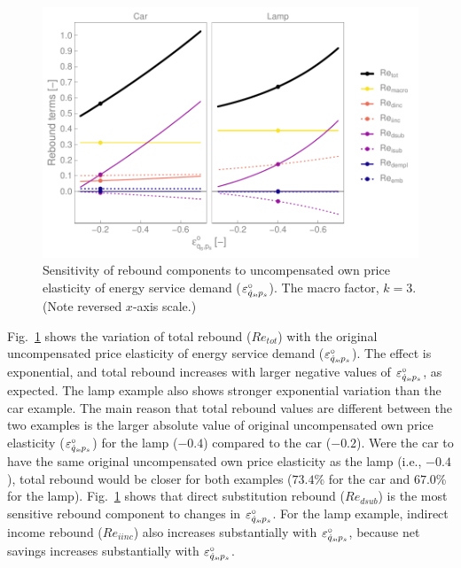 \documentclass[12pt]{article}\usepackage[]{graphicx}\usepackage[]{xcolor}
\makeatletter
\def\maxwidth{ %
  \ifdim\Gin@nat@width>\linewidth
    \linewidth
  \else
    \Gin@nat@width
  \fi
}
\newenvironment{knitrout}{}{} %
\makeatother
\begin{document}
\begin{knitrout}
\color{fgcolor}\begin{figure}

{\centering \includegraphics[width=\maxwidth]{figure/all_Re_terms_eps_graph-1} 

}

\caption[Sensitivity of rebound components to uncompensated own price elasticity of energy service demand ($\eqspsUCorig$)]{Sensitivity of rebound components to uncompensated own price elasticity of energy service demand ($\eqspsUCorig$). The macro factor, $k = 3$. (Note reversed $x$-axis scale.)}\label{fig:all_Re_terms_eps_graph}
\end{figure}

\end{knitrout}
  
  


Fig.~\ref{fig:all_Re_terms_eps_graph} shows the variation of total rebound ($Re_{tot}$)
with the original uncompensated price elasticity of energy service demand ($\eqspsUCorig$).
The effect is exponential, and
total rebound increases with larger negative values of $\eqspsUCorig$, as expected.
The lamp example also shows stronger exponential variation than the car example.
The main reason that total rebound values 
are different between the two examples
is the larger absolute value of original uncompensated own price elasticity ($\eqspsUCorig$) 
for the lamp ($-0.4$) compared to the car ($-0.2$).
Were the car to have the same original uncompensated own price elasticity
as the lamp (i.e., $-0.4$), 
total rebound would be closer for both examples 
($73.4$\% for the car and 
$67.0$\% for the lamp).
Fig.~\ref{fig:all_Re_terms_eps_graph} shows that direct substitution rebound 
($Re_{dsub}$) is the most sensitive rebound component to changes in $\varepsilon_{\dot{q}_s\!,p_s}^\circ$.
For the lamp example, indirect income rebound ($Re_{iinc}$) also increases
substantially with $\varepsilon_{\dot{q}_s\!,p_s}^\circ$, 
because net savings increases substantially with $\varepsilon_{\dot{q}_s\!,p_s}^\circ$. 
\end{document}
